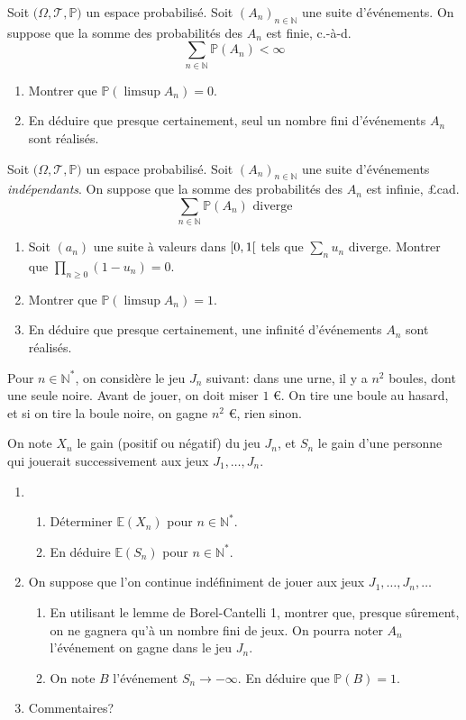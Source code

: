 \documentclass{yann}
\renewcommand{\T}{\mathscr{T}}
\newcommand{\Prob}{\bigl(Ω,\T,ℙ\bigr)}
\begin{document}

Soit $\Prob$ un espace probabilisé.
Soit $(A_n)_{n∈ℕ}$ une suite d'événements.
On suppose que la somme des probabilités des $A_n$ est finie,
c.-à-d. \[ ∑_{n∈ℕ} ℙ(A_n) < ∞ \]
\begin{enumerate}
\item
Montrer que $ℙ(\limsup A_n) = 0$.
\item
En déduire que presque certainement,
  seul un nombre fini d'événements $A_n$ sont réalisés.
\end{enumerate}


Soit $\Prob$ un espace probabilisé.
Soit $(A_n)_{n∈ℕ}$ une suite d'événements \emph{indépendants}.
On suppose que la somme des probabilités des $A_n$ est infinie,
£cad. \[ ∑_{n∈ℕ} ℙ(A_n) \text{ diverge} \]
\begin{enumerate}
\item
Soit $(a_n)$ une suite à valeurs dans $\mathopen[0,1\mathclose[$ tels que $∑_n u_n$ diverge.
  Montrer que $∏_{n≥0} (1 - u_n) = 0$.
\item
Montrer que $ℙ(\limsup A_n) = 1$.
\item
En déduire que presque certainement,
  une infinité d'événements $A_n$ sont réalisés.
\end{enumerate}

\Exercice

Pour $n∈ℕ^*$, on considère le jeu $J_n$ suivant:
dans une urne, il y a $n^2$ boules, dont une seule noire.
Avant de jouer, on doit miser $1$ €.
On tire une boule au hasard, et si on tire la boule noire, on gagne $n^2$ €, rien sinon.

On note $X_n$ le gain (positif ou négatif) du jeu $J_n$,
et $S_n$ le gain d'une personne qui jouerait successivement aux jeux $J_1, \dots, J_n$.
\begin{enumerate}
\item
\begin{enumerate}
\item
Déterminer $𝔼(X_n)$ pour $n∈ℕ^*$.
\item
En déduire $𝔼(S_n)$ pour $n∈ℕ^*$.
\end{enumerate}
\item
On suppose que l'on continue indéfiniment de jouer aux jeux $J_1, \dots, J_n, \dots$

  \begin{enumerate}
  \item
En utilisant le lemme de Borel-Cantelli 1, montrer que,
    presque sûrement, on ne gagnera qu'à un nombre fini de jeux.
    On pourra noter $A_n$ l'événement \og{}on gagne dans le jeu $J_n$\fg{}.
  \item
On note $B$ l'événement \og{}$S_n \to -∞$\fg{}.
    En déduire que $ℙ(B) = 1$.
  \end{enumerate}
\item
Commentaires?
\end{enumerate}
\end{document}
